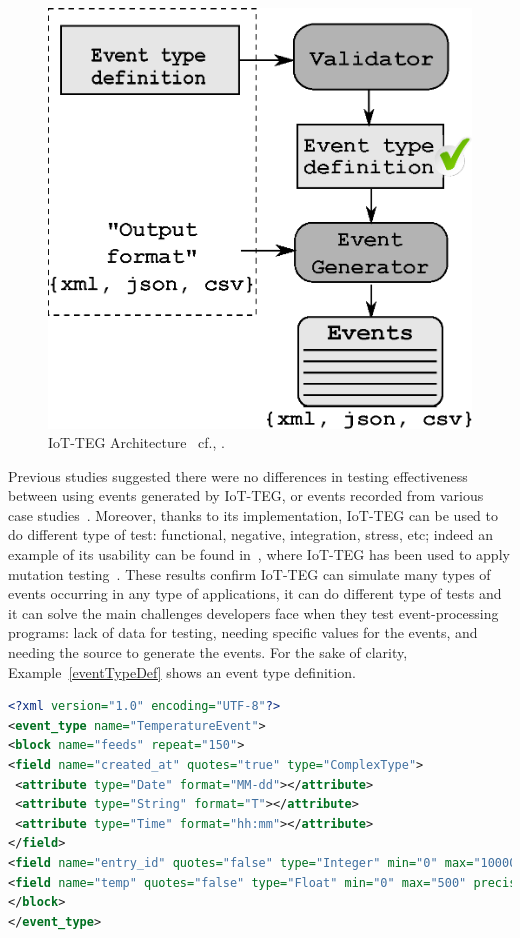 \documentclass[10pt,journal,compsoc]{IEEEtran}
\begin{document}
\begin{figure}[!ht]
	\centering
	\includegraphics[scale=0.4175]{Images/IoT-EGArchitecture.eps}
	\caption[IoT-TEG Architecture]{IoT-TEG Architecture~ cf.\cite{LorenaFall}, \cite{TesisGutierrez2017,Gutierrez2017}.}
	\label{fig:IoT-EGArquitecture}
\end{figure}
Previous studies suggested there were no differences in testing effectiveness between using events
generated by IoT-TEG, or events recorded from various case studies~\cite{Gutierrez2017,TesisGutierrez2017}.
Moreover, thanks to its implementation, IoT-TEG can be used to do different type of test: functional,
negative, integration, stress, etc; indeed an example of its usability can be found 
in~\cite{TesisGutierrez2017,gutierrez2018}, where IoT-TEG has been used to apply mutation 
testing~\cite{jia2011}. These results confirm IoT-TEG can 
simulate many types of events occurring in any type of applications, it can do different type of tests
and it can solve the main challenges developers face when they test event-processing programs: lack of data for testing, needing specific values for the events, and needing the source to generate the events.
For the sake of clarity, Example~\ref{eventTypeDef} shows an event type
definition.
\begin{lstlisting}[basicstyle=\ttfamily\footnotesize,language=XML,caption=Event type definition example cf.\cite{LorenaFall}.,label=eventTypeDef, breaklines=true]
<?xml version="1.0" encoding="UTF-8"?>
<event_type name="TemperatureEvent">
<block name="feeds" repeat="150">
<field name="created_at" quotes="true" type="ComplexType">
 <attribute type="Date" format="MM-dd"></attribute>
 <attribute type="String" format="T"></attribute>
 <attribute type="Time" format="hh:mm"></attribute>
</field>
<field name="entry_id" quotes="false" type="Integer" min="0" max="10000"></field>
<field name="temp" quotes="false" type="Float" min="0" max="500" precision="1"></field>
</block>
</event_type>
\end{lstlisting}
\end{document}
